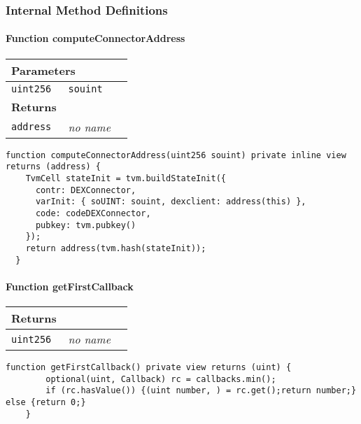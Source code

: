 \subsubsection{Internal Method Definitions}


\paragraph{Function computeConnectorAddress}


\ifsoltables
\noindent\begin{tabular}{|l|l|p{5cm}|}\hline
\multicolumn{3}{|l|}{\bf Parameters}\\\hline
\tt uint256 & \tt souint &\\\hline
\multicolumn{3}{|l|}{\bf Returns}\\\hline
\tt address & {\em no name} &\\\hline
\end{tabular}
\fi

\vspace{2cm}

\begin{lstlisting}[firstnumber=142]
  function computeConnectorAddress(uint256 souint) private inline view returns (address) {
    TvmCell stateInit = tvm.buildStateInit({
      contr: DEXConnector,
      varInit: { soUINT: souint, dexclient: address(this) },
      code: codeDEXConnector,
      pubkey: tvm.pubkey()
    });
    return address(tvm.hash(stateInit));
  }
\end{lstlisting}

\paragraph{Function getFirstCallback}


\ifsoltables
\noindent\begin{tabular}{|l|l|p{5cm}|}\hline
\multicolumn{3}{|l|}{\bf Returns}\\\hline
\tt uint256 & {\em no name} &\\\hline
\end{tabular}
\fi

\vspace{2cm}

\begin{lstlisting}[firstnumber=121]
  function getFirstCallback() private view returns (uint) {
		optional(uint, Callback) rc = callbacks.min();
		if (rc.hasValue()) {(uint number, ) = rc.get();return number;} else {return 0;}
	}
\end{lstlisting}

